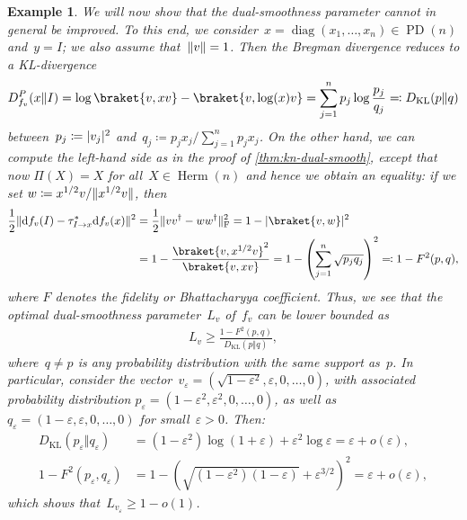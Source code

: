 \documentclass[11pt,letterpaper]{article}
\newtheorem{example}[theorem]{Example}\AddToHook{env/example/begin}{\crefalias{theorem}{example}}
\numberwithin{equation}{section}
\newcommand{\eps}{\varepsilon}
\newcommand{\diff}{\mathrm{d}}
\DeclareMathOperator{\PD}{PD}
\DeclareMathOperator{\diag}{diag}
\DeclareMathOperator{\Herm}{Herm}
\DeclarePairedDelimiter\abs{\lvert}{\rvert}
\DeclarePairedDelimiter\norm{\lVert}{\rVert}
\begin{document}
\begin{example}
We will now show that the dual-smoothness parameter cannot in general be improved.
To this end, we consider~$x=\diag(x_1,\dots,x_n)\in\PD(n)$ and~$y=I$; we also assume that~$\norm v=1$.
Then the Bregman divergence reduces to a KL-divergence
\begin{align*}
  D_{f_v}^P(x \Vert I)
= \log \braket{v, x v} - \braket{v, \log(x) v}
= \sum_{j=1}^n p_j \log \frac {p_j} {q_j}
\eqqcolon D_{\mathrm{KL}}(p \Vert q)
\end{align*}
between~$p_j \coloneqq \abs{v_j}^2$ and~$q_j \coloneqq p_j x_j / \sum_{j=1}^n p_j x_j$.
On the other hand, we can compute the left-hand side as in the proof of \cref{thm:kn-dual-smooth}, except that now $\Pi(X)=X$ for all~$X\in\Herm(n)$ and hence we obtain an equality:
if we set $w \coloneqq x^{1/2} v / \norm{x^{1/2} v}$, then
\begin{align*}
    \frac12 \norm{\diff f_v(I) - \tau^{\ast}_{I \to x}\diff f_v(x)}^2
&=   \frac12 \norm{ v v^\dagger - w w^\dagger }_{\mathrm F}^2
=   1 - \abs{\braket{v, w}}^2 \\
&=   1 - \frac{\braket{v, x^{1/2} v}^2}{\braket{v, x v}}
=   1 - \left( \sum_{j=1}^n \sqrt{p_j q_j} \right)^2
\eqqcolon 1 - F^2(p,q),
\end{align*}
where $F$ denotes the fidelity or Bhattacharyya coefficient.
Thus, we see that the optimal dual-smoothness parameter~$L_v$ of~$f_v$ can be lower bounded as
\begin{align*}
    L_v \geq \frac {1 - F^2(p,q)} {D_{\mathrm{KL}}(p \Vert q)},
\end{align*}
where~$q \neq p$ is any probability distribution with the same support as~$p$.
In particular, consider the vector~$v_\eps=(\sqrt{1-\eps^2},\eps,0,\dots,0)$, with associated probability distribution $p_\eps=(1-\eps^2,\eps^2,0,\dots,0)$, as well as $q_\eps=(1-\eps,\eps,0,\dots,0)$ for small~$\eps>0$.
Then:
\begin{align*}
    D_{\mathrm{KL}}(p_\eps \Vert q_\eps)
&= (1-\eps^2) \log(1+\eps) + \eps^2 \log \eps
= \eps + o(\eps),
\\
    1 - F^2(p_\eps,q_\eps)
&=  1 - \left( \sqrt{(1-\eps^2)(1-\eps)} + \eps^{3/2} \right)^2
= \eps + o(\eps),
\end{align*}
which shows that~$L_{v_\eps} \geq 1 - o(1)$.
\end{example}
\end{document}
